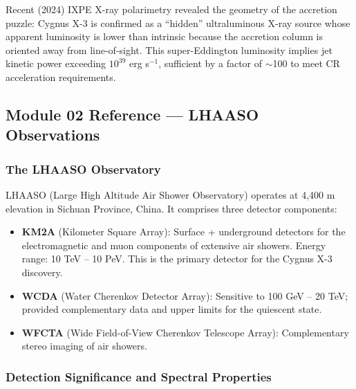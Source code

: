 \documentclass[11pt,letterpaper]{article}
\begin{document}
Recent (2024) IXPE X-ray polarimetry revealed the geometry of the accretion puzzle: Cygnus X-3 is confirmed as a ``hidden'' ultraluminous X-ray source whose apparent luminosity is lower than intrinsic because the accretion column is oriented away from line-of-sight. This super-Eddington luminosity implies jet kinetic power exceeding $10^{39}$ erg s$^{-1}$, sufficient by a factor of $\sim$100 to meet CR acceleration requirements.

\subsection{Module 02 Reference --- LHAASO Observations}

\subsubsection{The LHAASO Observatory}

LHAASO (Large High Altitude Air Shower Observatory) operates at 4,400 m elevation in Sichuan Province, China. It comprises three detector components:
\begin{itemize}[noitemsep]
  \item \textbf{KM2A} (Kilometer Square Array): Surface + underground detectors for the electromagnetic and muon components of extensive air showers. Energy range: 10 TeV -- 10 PeV. This is the primary detector for the Cygnus X-3 discovery.
  \item \textbf{WCDA} (Water Cherenkov Detector Array): Sensitive to 100 GeV -- 20 TeV; provided complementary data and upper limits for the quiescent state.
  \item \textbf{WFCTA} (Wide Field-of-View Cherenkov Telescope Array): Complementary stereo imaging of air showers.
\end{itemize}

\subsubsection{Detection Significance and Spectral Properties}
\end{document}
